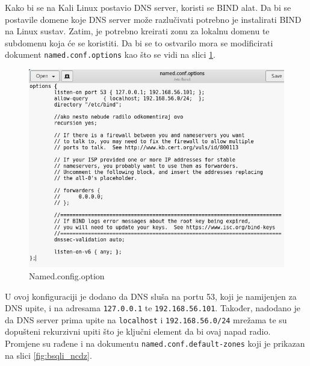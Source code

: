 \documentclass[12pt, oneside, onecolumn]{book}
\begin{document}
{Kako bi se na Kali Linux postavio DNS server, koristi se BIND alat. Da bi se postavile domene koje DNS server može razlučivati potrebno je instalirati BIND na Linux sustav. Zatim, je potrebno kreirati zonu za lokalnu domenu te subdomenu koja će se koristiti. Da bi se to ostvarilo mora se modificirati dokument \texttt{named.conf.options} kao što se vidi na slici \ref{fig:bsqli_nco}.

\begin{figure}[H]
	\begin{center}
		\includegraphics[width=\textwidth]{bsqli_nco.jpg}
		\caption{Named.config.option} \label{fig:bsqli_nco}
	\end{center}
\end{figure}

U ovoj konfiguraciji je dodano da DNS sluša na portu 53, koji je namijenjen za DNS upite, i na adresama \texttt{127.0.0.1} te \texttt{192.168.56.101}. Također, nadodano je da DNS server prima upite na \texttt{localhost} i \texttt{192.168.56.0/24} mrežama te su dopušteni rekurzivni upiti što je ključni element da bi ovaj napad radio. Promjene su rađene i na dokumentu \texttt{named.conf.default-zones} koji je prikazan na slici \ref{fig:bsqli_ncdz}.

}
\end{document}
